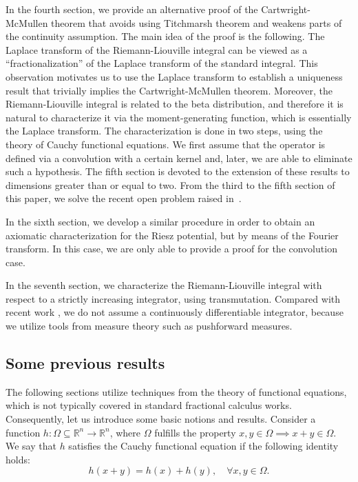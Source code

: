 \documentclass[12pt,reqno]{amsart}
\theoremstyle{plain}
\numberwithin{equation}{section} %
\begin{document}
In the fourth section, we provide an alternative proof of the Cartwright-McMullen theorem that avoids using Titchmarsh theorem and weakens parts of the continuity assumption. The main idea of the proof is the following. The Laplace transform of the Riemann-Liouville integral can be viewed as a ``fractionalization'' of the Laplace transform of the standard integral. This observation motivates us to use the Laplace transform to establish a uniqueness result that trivially implies the Cartwright-McMullen theorem. Moreover, the Riemann-Liouville integral is related to the beta distribution, and therefore it is natural to characterize it via the moment-generating function, which is essentially the Laplace transform. The characterization is done in two steps, using the theory of Cauchy functional equations. We first assume that the operator is defined via a convolution with a certain kernel and, later, we are able to eliminate such a hypothesis. The fifth section is devoted to the extension of these results to dimensions greater than or equal to two. From the third to the fifth section of this paper, we solve the recent open problem raised in~\cite{meu}.

In the sixth section, we develop a similar procedure in order to obtain an axiomatic characterization for the Riesz potential, but by means of the Fourier transform. In this case, we are only able to provide a proof for the convolution case. 

In the seventh section, we characterize the Riemann-Liouville integral with respect to a strictly increasing integrator, using transmutation. Compared with recent work \cite{cao_jie,meu}, we do not assume a continuously differentiable integrator, because we utilize tools from measure theory such as pushforward measures.


\subsection{Some previous results}

The following sections utilize techniques from the theory of functional equations, which is not typically covered in standard fractional calculus works. Consequently, let us introduce some basic notions and results.
Consider a function $h: \Omega \subseteq \mathbb{R}^n \to \mathbb{R}^n$, where $\Omega$ fulfills the property $x,y \in \Omega \implies x+y \in \Omega$. We say that $h$ satisfies the Cauchy functional equation if the following identity holds:
\begin{equation} \label{Cauchy}
    h(x+y)=h(x)+h(y), \quad \forall x,y \in \Omega.
\end{equation}
\end{document}
